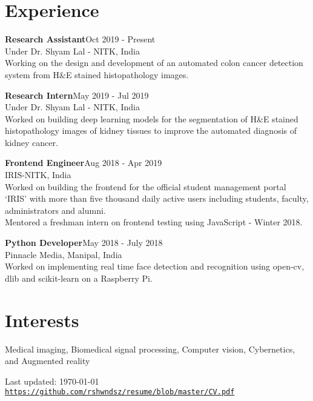 \documentclass[letterpaper]{article}
\def\footerlink{https://github.com/rshwndsz/resume/blob/master/CV.pdf}
\renewenvironment{itemize}{
  \begin{list}{}{
    \setlength{\leftmargin}{1.5em}
  }
}{
  \end{list}
}
\begin{document}
\section*{Experience}
  \begin{itemize}
    \item \textbf{Research Assistant}\hfill{\textcolor{black!80}{\small{Oct 2019 - Present}}}\\
    \textcolor{black!80}{\small{Under Dr. Shyam Lal - NITK, India}}\\
    Working on the design and development of an automated colon cancer detection system from H\&E stained histopathology images.

    \item \textbf{Research Intern}\hfill{\textcolor{black!80}{\small{May 2019 - Jul 2019}}}\\
    \textcolor{black!80}{\small{Under Dr. Shyam Lal - NITK, India}}\\
    Worked on building deep learning models for the segmentation of H\&E stained histopathology images of kidney tissues to improve the automated diagnosis of kidney cancer.

    \item \textbf{Frontend Engineer}\hfill{\textcolor{black!80}{\small{Aug 2018 - Apr 2019}}}\\
    \textcolor{black!80}{\small{IRIS-NITK, India}}\\
    Worked on building the frontend for the official student management portal `IRIS' with more than five thousand daily active users including students, faculty, administrators and alumni.\\
    Mentored a freshman intern on frontend testing using JavaScript - Winter 2018.

    \item \textbf{Python Developer}\hfill{\textcolor{black!80}{\small{May 2018 - July 2018}}}\\
    \textcolor{black!80}{\small{Pinnacle Media, Manipal, India}}\\
    Worked on implementing real time face detection and recognition using open-cv, dlib and scikit-learn on a Raspberry Pi.
  \end{itemize}


\section*{Interests}
  \begin{itemize}
    \item Medical imaging, Biomedical signal processing, Computer vision, Cybernetics, and Augmented reality
  \end{itemize}


\bigskip
\begin{center}
  \begin{footnotesize}
    Last updated: \today \\
    \href{\footerlink}{\texttt{\footerlink}}
  \end{footnotesize}
\end{center}
\end{document}
